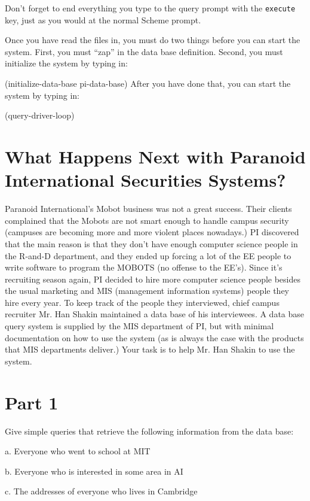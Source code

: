 \vpar
Don't forget to end everything you type to the query prompt with the
{\tt execute} key, just as you would at the normal Scheme prompt.

\vpar
Once you have read the files in, you must do two things before you can
start the system.  First, you must ``zap'' in the data base definition.
Second, you must initialize the system by typing in:

\beginlisp
(initialize-data-base pi-data-base)
\endlisp
\vpar
After you have done that, you can start the system by typing in:

\beginlisp
(query-driver-loop)
\endlisp

\section{What Happens Next with Paranoid International Securities Systems?}

Paranoid International's Mobot business was not a great success.  Their
clients complained that the Mobots are not smart enough to handle campus
security (campuses are becoming more and more violent places nowadays.)
PI discovered that the main reason is that they don't have enough computer
science people in the R-and-D department, and they ended up forcing a lot of
the EE people to write software to program the MOBOTS (no offense to the
EE's).  Since it's recruiting season again, PI decided to hire more
computer science people besides the usual marketing and MIS (management
information systems) people they hire every year.  To keep track of the
people they interviewed, chief campus recruiter Mr. Han Shakin maintained
a data base of his interviewees.  A data base query system is supplied
by the MIS department of PI, but with minimal documentation on how to
use the system (as is always the case with the products that MIS departments
deliver.)  Your task is to help Mr. Han Shakin to use the system.

\section{Part 1}

Give simple queries that retrieve the following information from the
data base:

\bpar a. Everyone who went to school at MIT

\bpar b. Everyone who is interested in some area in AI

\bpar c. The addresses of everyone who lives in Cambridge

